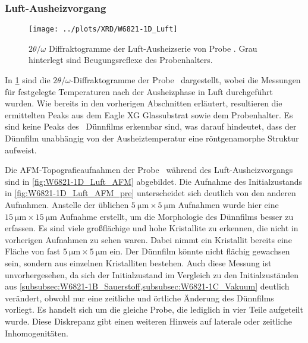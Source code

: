 \subsubsection{Luft-Ausheizvorgang}\label{subsubsec:W6821-1D_Luft}
\begin{figure}
    \centering
    \texttt{[image: ../plots/XRD/W6821-1D\_Luft]}

    \caption{$2\theta/\omega$ Diffraktogramme der Luft-Ausheizserie von Probe \sampleone.
    Grau hinterlegt sind Beugungsreflexe des Probenhalters.}
    \label{fig:W6821-1D_Luft_XRD}
\end{figure}
In \cref{fig:W6821-1D_Luft_XRD} sind die $2\theta/\omega$-Diffraktogramme der Probe \sampleone\ dargestellt,
wobei die Messungen für festgelegte Temperaturen nach der Ausheizphase in Luft durchgeführt wurden.
Wie bereits in den vorherigen Abschnitten erläutert, resultieren die ermittelten Peaks aus dem Eagle XG Glassubstrat
sowie dem Probenhalter.
Es sind keine Peaks des \heo\ Dünnfilms erkennbar sind, was darauf hindeutet, dass der Dünnfilm unabhängig von der
Ausheiztemperatur eine röntgenamorphe Struktur aufweist.

Die AFM-Topografieaufnahmen der Probe \sampleone\ während des Luft-Ausheizvorgangs sind in \cref{fig:W6821-1D_Luft_AFM}
abgebildet.
Die Aufnahme des Initialzustands in \cref{fig:W6821-1D_Luft_AFM_pre}
unterscheidet sich deutlich von den anderen Aufnahmen.
Anstelle der üblichen $\qty{5}{\micro\meter} \times \qty{5}{\micro\meter}$ Aufnahmen wurde hier eine
$\qty{15}{\micro\meter} \times \qty{15}{\micro\meter}$ Aufnahme erstellt, um die Morphologie des Dünnfilms besser zu
erfassen.
Es sind viele großflächige und hohe Kristallite zu erkennen, die nicht in vorherigen Aufnahmen zu sehen waren.
Dabei nimmt ein Kristallit bereits eine Fläche von fast $\qty{5}{\micro\meter} \times \qty{5}{\micro\meter}$ ein.
Der Dünnfilm könnte nicht flächig gewachsen sein, sondern aus einzelnen Kristalliten bestehen.
Auch diese Messung ist unvorhergesehen, da sich der Initialzustand im Vergleich zu den Initialzuständen aus
\cref{subsubsec:W6821-1B_Sauerstoff,subsubsec:W6821-1C_Vakuum} deutlich verändert, obwohl nur eine zeitliche
und örtliche Änderung des Dünnfilms vorliegt.
Es handelt sich um die gleiche Probe, die lediglich in vier Teile aufgeteilt wurde.
Diese Diskrepanz gibt einen weiteren Hinweis auf laterale oder zeitliche Inhomogenitäten.

